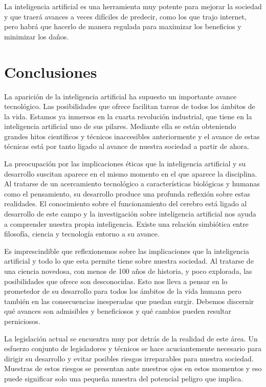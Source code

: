 \documentclass[12pt,a4paper]{article}
\begin{document}
La inteligencia artificial es una herramienta muy potente para mejorar la sociedad y que traerá avances a veces difíciles de predecir, como los que trajo internet, pero habrá que hacerlo de manera regulada para maximizar los beneficios y minimizar los daños.

\section{Conclusiones}

La aparición de la inteligencia artificial ha supuesto un importante avance tecnológico. Las posibilidades que ofrece facilitan tareas de todos los ámbitos de la vida. Estamos ya inmersos en la cuarta revolución industrial, que tiene en la inteligencia artificial uno de sus pilares. Mediante ella se están obteniendo grandes hitos científicos y técnicos inaccesibles anteriormente y el avance de estas técnicas está por tanto ligado al avance de nuestra sociedad a partir de ahora.

La preocupación por las implicaciones éticas que la inteligencia artificial y su desarrollo suscitan aparece en el mismo momento en el que aparece la disciplina. Al tratarse de un acercamiento tecnológico a características biológicas y humanas como el pensamiento, su desarrollo produce una profunda reflexión sobre estas realidades. El conocimiento sobre el funcionamiento del cerebro está ligado al desarrollo de este campo y la investigación sobre inteligencia artificial nos ayuda a comprender nuestra propia inteligencia. Existe una relación simbiótica entre filosofía, ciencia y tecnología entorno a su avance.

Es imprescindible que reflexionemos sobre las implicaciones que la inteligencia artificial y todo lo que esta permite tiene sobre nuestra sociedad. Al tratarse de una ciencia novedosa, con menos de 100 años de historia, y poco explorada, las posibilidades que ofrece son desconocidas. Esto nos lleva a pensar en lo prometedor de su desarrollo para todos los ámbitos de la vida humana pero también en las consecuencias inesperadas que puedan surgir. Debemos discernir qué avances son admisibles y beneficiosos y qué cambios pueden resultar perniciosos.

La legislación actual se encuentra muy por detrás de la realidad de este área. Un esfuerzo conjunto de legisladores y técnicos se hace acuciantemente necesario para dirigir su desarrollo y evitar posibles riesgos irreparables para nuestra sociedad. Muestras de estos riesgos se presentan ante nuestros ojos en estos momentos y eso puede significar solo una pequeña muestra del potencial peligro que implica.
\end{document}
